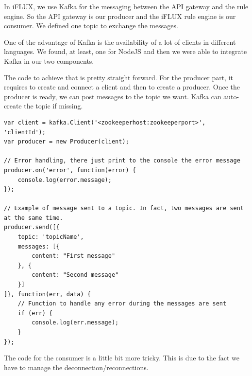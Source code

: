 In iFLUX, we use Kafka for the messaging between the API gateway and the rule engine. So the API gateway is our producer and the iFLUX rule engine is our consumer. We defined one topic to exchange the messages.

One of the advantage of Kafka is the availability of a lot of clients in different languages. We found, at least, one for NodeJS and then we were able to integrate Kafka in our two components.

The code to achieve that is pretty straight forward. For the producer part, it requires to create and connect a client and then to create a producer. Once the producer is ready, we can post messages to the topic we want. Kafka can auto-create the topic if missing.

\begin{lstlisting}
var client = kafka.Client('<zookeeperhost:zookeeperport>', 'clientId');
var producer = new Producer(client);

// Error handling, there just print to the console the error message
producer.on('error', function(error) {
	console.log(error.message);
});

// Example of message sent to a topic. In fact, two messages are sent at the same time.
producer.send([{ 
	topic: 'topicName', 
	messages: [{
		content: "First message"
	}, {
		content: "Second message"
	}]
]}, function(err, data) {
	// Function to handle any error during the messages are sent
	if (err) {
		console.log(err.message);
	}
});
\end{lstlisting}

The code for the consumer is a little bit more tricky. This is due to the fact we have to manage the deconnection/reconnections.

